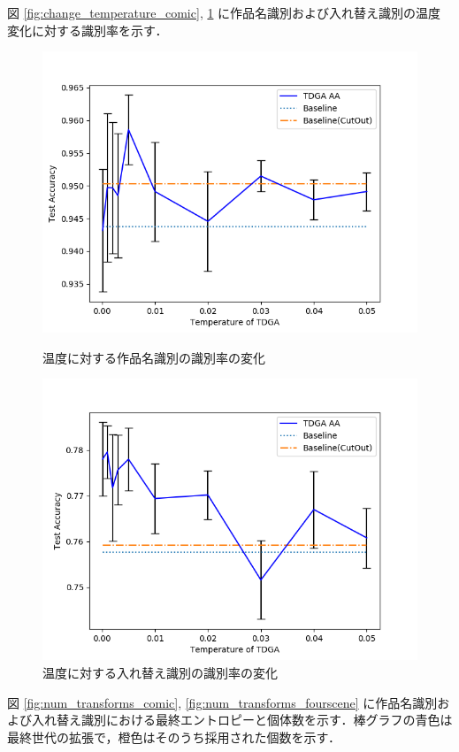 \documentclass[onecolumn]{ujarticle}   %
\begin{document}
  図 \ref{fig:change_temperature_comic}, \ref{fig:change_temperature_fourscene} に作品名識別および入れ替え識別の温度変化に対する識別率を示す．

  \begin{figure}[h]
  \centering
  \includegraphics[width=0.6\columnwidth]{figure/exp_change_temperature_comic.png}
  \caption{温度に対する作品名識別の識別率の変化}
  \label{fig:change_temperature_comic}

  \includegraphics[width=0.6\columnwidth]{figure/exp_change_temperature_fourscene.png}
  \caption{温度に対する入れ替え識別の識別率の変化}
  \label{fig:change_temperature_fourscene}
  \end{figure}

  図 \ref{fig:num_transforms_comic}, \ref{fig:num_transforms_fourscene} に作品名識別および入れ替え識別における最終エントロピーと個体数を示す．棒グラフの青色は最終世代の拡張で，橙色はそのうち採用された個数を示す．
\end{document}

